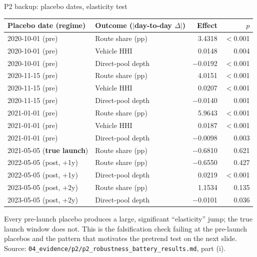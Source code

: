 \documentclass[aspectratio=169]{beamer}
\begin{document}
\begin{frame}{P2 backup: placebo dates, elasticity test}
  \footnotesize
  \begin{center}
  \begin{tabular}{@{}l l r r@{}}
    \toprule
    Placebo date (regime) & Outcome ($|$day-to-day $\Delta|$) & Effect & $p$ \\
    \midrule
    2020-10-01 (pre) & Route share (pp) & 3.4318 & $<$0.001 \\
    2020-10-01 (pre) & Vehicle HHI & 0.0148 & 0.004 \\
    2020-10-01 (pre) & Direct-pool depth & $-$0.0192 & $<$0.001 \\
    2020-11-15 (pre) & Route share (pp) & 4.0151 & $<$0.001 \\
    2020-11-15 (pre) & Vehicle HHI & 0.0207 & $<$0.001 \\
    2020-11-15 (pre) & Direct-pool depth & $-$0.0140 & 0.001 \\
    2021-01-01 (pre) & Route share (pp) & 5.9643 & $<$0.001 \\
    2021-01-01 (pre) & Vehicle HHI & 0.0187 & $<$0.001 \\
    2021-01-01 (pre) & Direct-pool depth & $-$0.0098 & 0.003 \\
    2021-05-05 (\textbf{true launch}) & Route share (pp) & $-$0.6810 & 0.621 \\
    2022-05-05 (post, +1y) & Route share (pp) & $-$0.6550 & 0.427 \\
    2022-05-05 (post, +1y) & Direct-pool depth & 0.0219 & $<$0.001 \\
    2023-05-05 (post, +2y) & Route share (pp) & 1.1534 & 0.135 \\
    2023-05-05 (post, +2y) & Direct-pool depth & $-$0.0101 & 0.036 \\
    \bottomrule
  \end{tabular}
  \end{center}
  \vspace{-0.3em}
  \footnotesize Every pre-launch placebo produces a large, significant ``elasticity'' jump; the true launch window does not. This is the falsification check failing at the pre-launch placebos and the pattern that motivates the pretrend test on the next slide.
  {\scriptsize Source: \texttt{04\_evidence/p2/p2\_robustness\_battery\_results.md}, part (i).}
\end{frame}
\end{document}
